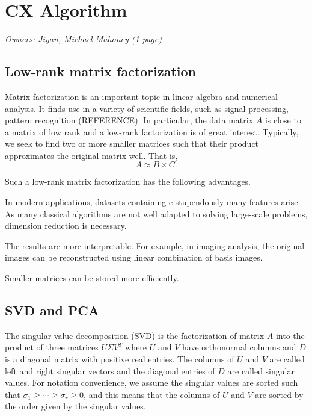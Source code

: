 \section{CX Algorithm}
\textit{Owners: Jiyan, Michael Mahoney (1 page)}

\subsection{Low-rank matrix factorization}
Matrix factorization is an important topic in linear algebra and numerical analysis.
It finds use in a variety of scientific fields, such as signal processing, pattern recognition (REFERENCE).
In particular, the data matrix $A$ is close to a matrix of low rank and a low-rank factorization is of great interest.
Typically, we seek to find two or more smaller matrices such that their product approximates the original matrix well.
That is,
\begin{equation}
    A \approx B \times C.
\end{equation}

Such a low-rank matrix factorization has the following advantages.
\begin{compactitem}
\item
In modern applications, datasets containing e stupendously many features arise. As many classical algorithms are not well adapted to solving large-scale problems, dimension reduction is necessary.
\item
The results are more interpretable.
For example, in imaging analysis, the original images can be reconstructed using linear combination of basis images.
\item
Smaller matrices can be stored more efficiently.
\end{compactitem}

\subsection{SVD and PCA}
The singular value decomposition (SVD) is the factorization of matrix $A$ into the product of three matrices $U\Sigma V^T$ where $U$ and $V$ have orthonormal columns and $D$ is a diagonal matrix with positive real entries. The columns of $U$ and $V$ are called left and right singular vectors and the diagonal entries of $D$ are called singular values. For notation convenience, we assume the singular values are sorted such that $\sigma_1\geq \cdots \geq \sigma_r\geq 0$, and
this means that the columns of $U$ and $V$ are sorted by the order given by the singular values.

